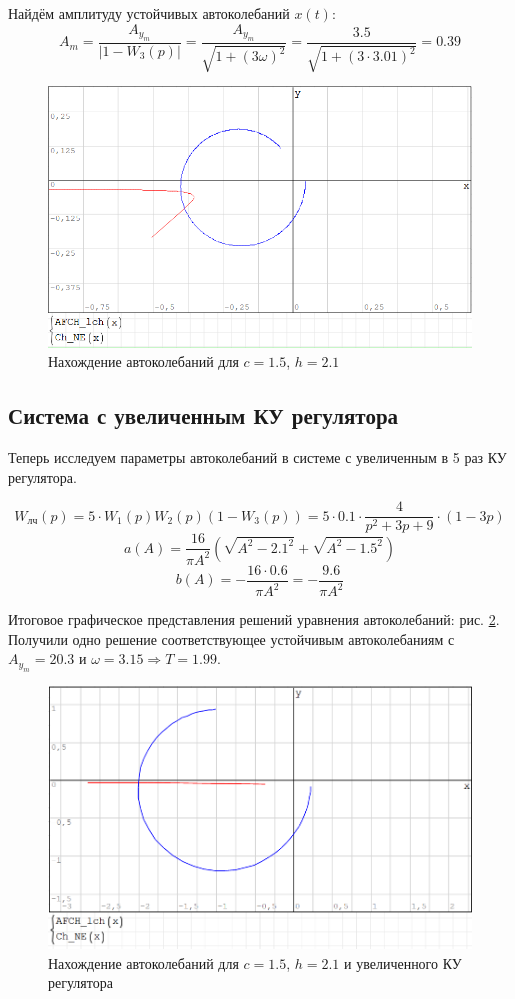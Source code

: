 	Найдём амплитуду устойчивых автоколебаний $x(t)$:
	\begin{equation*}
		A_m = \frac{A_{y_m}}{|1-W_3(p)|} = \frac{A_{y_m}}{\sqrt{1+(3\omega)^2}} = \frac{3.5}{\sqrt{1+(3\cdot3.01)^2}} = 0.39
	\end{equation*}
	
	\begin{figure}[h]
		\centering\includegraphics[width=.7\textwidth]{png/GF2.png}
		\caption{Нахождение автоколебаний для $c=1.5$, $h=2.1$}
		\label{GF2}
	\end{figure}
	
	\subsection{Система с увеличенным КУ регулятора}
	
	Теперь исследуем параметры автоколебаний в системе с увеличенным в 5 раз КУ регулятора.
	
	\begin{equation*}
		W_{\text{лч}}(p) = 5\cdot W_1(p)W_2(p)(1-W_3(p)) = 5\cdot0.1\cdot\frac{4}{p^2+3p+9}\cdot(1-3p)
	\end{equation*} 
	\begin{equation*}
		a(A) = \frac{16}{\pi A^2}(\sqrt{A^2 - 2.1^2} + \sqrt{A^2 - 1.5^2})
	\end{equation*}
	\begin{equation*}
		b(A) = -\frac{16\cdot 0.6}{\pi A^2} = -\frac{9.6}{\pi A^2}
	\end{equation*}
	
	Итоговое графическое представления решений уравнения автоколебаний: рис. \ref{GF3}. Получили одно решение соответствующее устойчивым автоколебаниям с $A_{y_m} = 20.3$ и $\omega = 3.15\Rightarrow T=1.99$.
	
	\begin{figure}[h]
		\centering\includegraphics[width=.7\textwidth]{png/GF3.png}
		\caption{Нахождение автоколебаний для $c=1.5$, $h=2.1$ и увеличенного КУ регулятора}
		\label{GF3}
	\end{figure}
	
